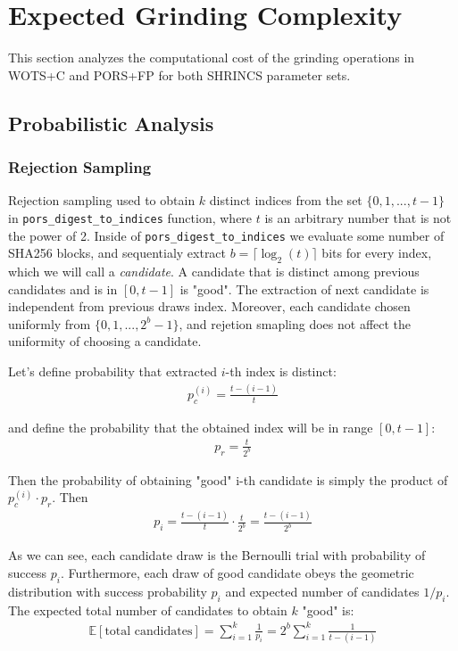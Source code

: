 \section{Expected Grinding Complexity}
This section analyzes the computational cost of the grinding operations in WOTS+C and PORS+FP for both SHRINCS parameter sets.

\subsection{Probabilistic Analysis}
\subsubsection{Rejection Sampling}
Rejection sampling used to obtain $k$ distinct indices from the set $\{0,1,...,t-1\}$ in \texttt{pors\_digest\_to\_indices} function, where $t$ is an arbitrary number that is not the power of 2. 
Inside of \texttt{pors\_digest\_to\_indices} we evaluate some number of SHA256 blocks, and sequentialy extract $b = \lceil\log_2{(t)}\rceil$ bits for every index, which we will call a \emph{candidate}. 
A candidate that is distinct among previous candidates and is in $[0,t-1]$ is "good".
The extraction of next candidate is independent from previous draws index. Moreover, each candidate chosen uniformly from $\{0,1,...,2^b-1\}$, and rejetion smapling does not affect the uniformity of choosing a candidate.

Let's define probability that extracted $i$-th index is distinct:
\begin{align}
    p^{(i)}_c = \frac{t-(i-1)}{t}
\end{align}

and define the probability that the obtained index will be in range $[0,t-1]$:
\begin{align}
    p_r = \frac{t}{2^b}
\end{align}

Then the probability of obtaining "good" i-th candidate is simply the product of $p^{(i)}_c\cdot p_r$. Then
\begin{align}
    p_i = \frac{t-(i-1)}{t}\cdot \frac{t}{2^b} =  \frac{t - (i-1)}{2^b}
\end{align}

As we can see, each candidate draw is the Bernoulli trial with probability of success $p_i$. 
Furthermore, each draw of good candidate obeys the geometric distribution with success probability $p_i$ and expected number of candidates $1/p_i$.
The expected total number of candidates to obtain $k$ "good" is:
\begin{align}
    \mathbb{E}\left[\text{total candidates}\right] = \sum_{i=1}^{k} \frac{1}{p_i} = 2^b\sum_{i=1}^{k} \frac{1}{t - (i-1)}
\end{align}


